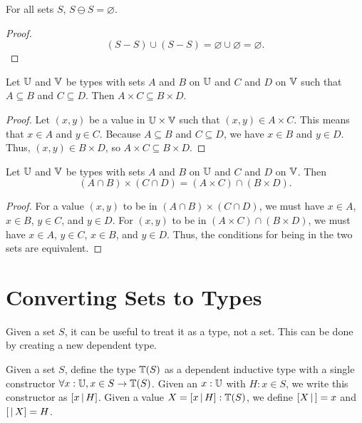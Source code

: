 \documentclass[../../math.tex]{subfiles}
\begin{document}
\begin{theorem}
    For all sets $S$, $S \ominus S = \varnothing$.
\end{theorem}
\begin{proof}
    \[
        (S - S) \cup (S - S) = \varnothing \cup \varnothing = \varnothing.
    \]
\end{proof}

\begin{theorem}
    Let $\mathbb{U}$ and $\mathbb{V}$ be types with sets $A$ and $B$ on $\mathbb{U}$ and $C$ and $D$ on
    $\mathbb{V}$ such that $A \subseteq B$ and $C \subseteq D$.  Then $A \times C
    \subseteq B \times D$.
\end{theorem}
\begin{proof}
    Let $(x, y)$ be a value in $\mathbb{U} \times \mathbb{V}$ such that $(x, y) \in A \times C$.
    This means that $x \in A$ and $y \in C$.  Because $A \subseteq B$ and $C
    \subseteq D$, we have $x \in B$ and $y \in D$.  Thus, $(x, y) \in B \times
    D$, so $A \times C \subseteq B \times D$.
\end{proof}

\begin{theorem}
    Let $\mathbb{U}$ and $\mathbb{V}$ be types with sets $A$ and $B$ on $\mathbb{U}$ and $C$ and $D$ on
    $\mathbb{V}$.  Then
    \[
        (A \cap B) \times (C \cap D) = (A \times C) \cap (B \times D).
    \]
\end{theorem}
\begin{proof}
    For a value $(x, y)$ to be in $(A \cap B) \times (C \cap D)$, we must have
    $x \in A$, $x \in B$, $y \in C$, and $y \in D$.  For $(x, y)$ to be in $(A
    \times C) \cap (B \times D)$, we must have $x \in A$, $y \in C$, $x \in B$,
    and $y \in D$.  Thus, the conditions for being in the two sets are
    equivalent.
\end{proof}

\section{Converting Sets to Types}

Given a set $S$, it can be useful to treat it as a type, not a set.  This can be
done by creating a new dependent type.

\begin{definition}
    Given a set $S$, define the type $\mathbb{T}(S)$ as a dependent inductive type with
    a single constructor $\forall x : \mathbb{U}, x \in S \rightarrow \mathbb{T}(S)$.  Given an
    $x : \mathbb{U}$ with $H : x \in S$, we write this constructor as $[ x \, | \, H ]$.
    Given a value $X = [ x \, | \, H ] : \mathbb{T}(S)$, we define $[ X\, |\,] = x$ and $[ \,|\, X ]
    = H$.
\end{definition}
\end{document}
